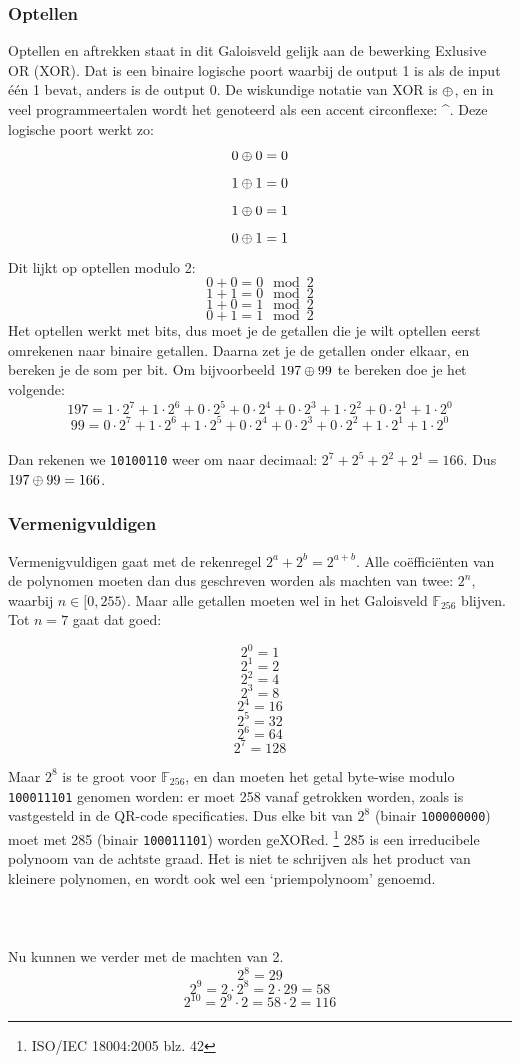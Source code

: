 \documentclass[a4paper]{article}
\begin{document}
\subsubsection{Optellen}
Optellen en aftrekken staat in dit Galoisveld gelijk aan de bewerking Exlusive OR (XOR). Dat is een binaire logische poort waarbij de output 1 is als de input één 1 bevat, anders is de output 0. De wiskundige notatie van XOR is $\mathbin{\oplus}$, en in veel programmeertalen wordt het genoteerd als een accent circonflexe: ^. Deze logische poort werkt zo:
$$0\mathbin{\oplus}0=0$$
$$1\mathbin{\oplus}1=0$$
$$1\mathbin{\oplus}0=1$$
$$0\mathbin{\oplus}1=1$$
Dit lijkt op optellen modulo 2:
$$0+0=0\mod{2}$$
$$1+1=0\mod{2}$$
$$1+0=1\mod{2}$$
$$0+1=1\mod{2}$$
Het optellen werkt met bits, dus moet je de getallen die je wilt optellen eerst omrekenen naar binaire getallen. Daarna zet je de getallen onder elkaar, en bereken je de som per bit. Om bijvoorbeeld $197 \mathbin{\oplus} 99$ te bereken doe je het volgende:
$$197 = 1\cdot2^7 + 1\cdot2^6 + 0\cdot2^5 + 0\cdot2^4 + 0\cdot2^3+ 1\cdot2^2 + 0\cdot2^1 + 1\cdot2^0$$
$$99 = 0\cdot2^7 + 1\cdot2^6 + 1\cdot2^5 + 0\cdot2^4 + 0\cdot2^3+ 0\cdot2^2 + 1\cdot2^1 + 1\cdot2^0$$
\\
Dan rekenen we \texttt{10100110} weer om naar decimaal: $2^7+2^5+2^2+2^1=166$. Dus $197 \mathbin{\oplus} 99 = 166$.
\subsubsection{Vermenigvuldigen}
Vermenigvuldigen gaat met de rekenregel $2^a+2^b=2^{a+b}$. Alle coëfficiënten van de polynomen moeten dan dus geschreven worden als machten van twee: $2^n$, waarbij $n \in [0,255\rangle$. Maar alle getallen moeten wel in het Galoisveld $\mathbb{F}_{256}$ blijven. Tot $n = 7$ gaat dat goed:

$$2^0=1$$
$$2^1=2$$
$$2^2=4$$
$$2^3=8$$
$$2^4=16$$
$$2^5=32$$
$$2^6=64$$
$$2^7=128$$

Maar $2^8$ is te groot voor $\mathbb{F}_{256}$, en dan moeten het getal byte-wise modulo \texttt{100011101} genomen worden: er moet 258 vanaf getrokken worden, zoals is vastgesteld in de QR-code specificaties. Dus elke bit van $2^8$ (binair \texttt{100000000}) moet met 285 (binair \texttt{100011101}) worden geXORed.
\footnote{ISO/IEC 18004:2005 blz. 42}
285 is een irreducibele polynoom van de achtste graad. Het is niet te schrijven als het product van kleinere polynomen, en wordt ook wel een `priempolynoom' genoemd.\\\\
\\\\
Nu kunnen we verder met de machten van 2.
$$2^8 = 29$$
$$2^9 = 2\cdot2^8 = 2\cdot29 = 58$$
$$2^{10} = 2^9 \cdot 2 = 58 \cdot 2 = 116$$
\end{document}
